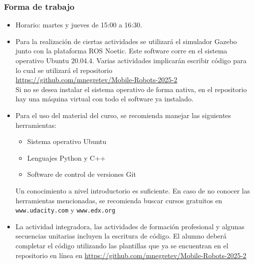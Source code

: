 \begin{frame}\frametitle{Forma de trabajo}
  \begin{itemize}
  \item Horario: martes y jueves de 15:00 a 16:30.\\
  \item Para la realización de ciertas actividades se utilizará el simulador Gazebo junto con la plataforma ROS Noetic. Este software corre en el sistema operativo Ubuntu 20.04.4. Varias actividades implicarán escribir código para lo cual se utilizará el repositorio\\
    \url{https://github.com/mnegretev/Mobile-Robots-2025-2}\\
    Si no se desea instalar el sistema operativo de forma nativa, en el repositorio hay una máquina virtual con todo el software ya instalado.
  \item Para el uso del material del curso, se recomienda manejar las siguientes herramientas:
    \begin{itemize}
    \item Sistema operativo Ubuntu
    \item Lenguajes Python y C++
    \item Software de control de versiones Git
    \end{itemize}
    Un conocimiento a nivel introductorio es suficiente. En caso de no conocer las herramientas mencionadas, se recomienda buscar cursos gratuitos en \texttt{www.udacity.com} y \texttt{www.edx.org}
  \item La actividad integradora, las actividades de formación profesional y algunas secuencias unitarias incluyen la escritura de código. El alumno deberá completar el código utilizando las plantillas que ya se encuentran en el repositorio en línea en \url{https://github.com/mnegretev/Mobile-Robots-2025-2}
  \end{itemize}
\end{frame}

